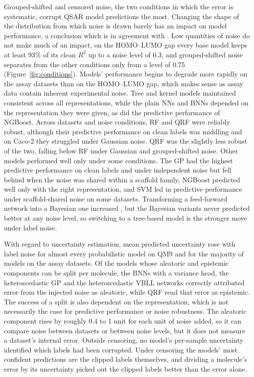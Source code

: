 Grouped-shifted and censored noise, the two conditions in which the error is systematic, corrupt QSAR model predictions the most. Changing the shape of the distribution from which noise is drawn barely has an impact on model performance, a conclusion which is in agreement with \citet{Heid2023}.
Low quantities of noise do not make much of an impact, on the HOMO--LUMO gap every base model keeps at least 93\% of its clean $R^2$ up to a noise level of 0.3, and grouped-shifted noise separates from the other conditions only from a level of 0.75 (Figure~\ref{fig:conditions}). Models' performance begins to degrade more rapidly on the assay datasets than on the HOMO--LUMO gap, which makes sense as assay data contain inherent experimental noise. Tree and kernel models maintained consistent \aucnorm{} across all representations, while the plain NNs and BNNs depended on the representation they were given, as did the predictive performance of NGBoost. Across datasets and noise conditions, RF and QRF were reliably robust, although their predictive performance on clean labels was middling and on Caco-2 they struggled under Gaussian noise. QRF was the slightly less robust of the two, falling below RF under Gaussian and grouped-shifted noise. Other models performed well only under some conditions. The GP had the highest predictive performance on clean labels and under independent noise but fell behind when the noise was shared within a scaffold family, NGBoost predicted well only with the right representation, and SVM led in predictive performance under scaffold-shared noise on some datasets. Transforming a feed-forward network into a Bayesian one increased \aucnorm, but the Bayesian variants never predicted better at any noise level, so switching to a tree-based model is the stronger move under label noise.

With regard to uncertainty estimation, mean predicted uncertainty rose with label noise for almost every probabilistic model on QM9 and for the majority of models on the assay datasets. Of the models whose aleatoric and epistemic components can be split per molecule, the BNNs with a variance head, the heteroscedastic GP and the heteroscedastic VBLL networks correctly attributed error from the injected noise as aleatoric, while QRF read that error as epistemic. The success of a split is also dependent on the representation, which is not necessarily the case for predictive performance or noise robustness. The aleatoric component rises by roughly 0.4 to 1 unit for each unit of noise added, so it can compare noise between datasets or between noise levels, but it does not measure a dataset's internal error. Outside censoring, no model's per-sample uncertainty identified which labels had been corrupted. Under censoring the models' most confident predictions are the clipped labels themselves, and dividing a molecule's error by its uncertainty picked out the clipped labels better than the error alone.

